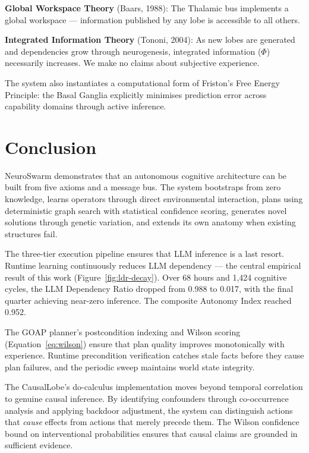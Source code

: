 \documentclass[12pt,a4paper]{report}
\begin{document}
\textbf{Global Workspace Theory} (Baars, 1988): The Thalamic bus implements a global workspace --- information published by any lobe is accessible to all others.

\textbf{Integrated Information Theory} (Tononi, 2004): As new lobes are generated and dependencies grow through neurogenesis, integrated information ($\Phi$) necessarily increases. We make no claims about subjective experience.

The system also instantiates a computational form of Friston's Free Energy Principle: the Basal Ganglia explicitly minimises prediction error across capability domains through active inference.

\chapter{Conclusion}

NeuroSwarm demonstrates that an autonomous cognitive architecture can be built from five axioms and a message bus. The system bootstraps from zero knowledge, learns operators through direct environmental interaction, plans using deterministic graph search with statistical confidence scoring, generates novel solutions through genetic variation, and extends its own anatomy when existing structures fail.

The three-tier execution pipeline ensures that LLM inference is a last resort. Runtime learning continuously reduces LLM dependency --- the central empirical result of this work (Figure~\ref{fig:ldr-decay}). Over 68 hours and 1{,}424 cognitive cycles, the LLM Dependency Ratio dropped from 0.988 to 0.017, with the final quarter achieving near-zero inference. The composite Autonomy Index reached 0.952.

The GOAP planner's postcondition indexing and Wilson scoring (Equation~\ref{eq:wilson}) ensure that plan quality improves monotonically with experience. Runtime precondition verification catches stale facts before they cause plan failures, and the periodic sweep maintains world state integrity.

The CausalLobe's do-calculus implementation moves beyond temporal correlation to genuine causal inference. By identifying confounders through co-occurrence analysis and applying backdoor adjustment, the system can distinguish actions that \emph{cause} effects from actions that merely precede them. The Wilson confidence bound on interventional probabilities ensures that causal claims are grounded in sufficient evidence.
\end{document}
